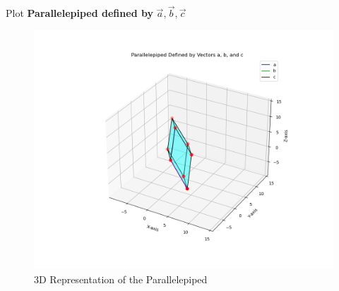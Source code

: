 \documentclass{beamer}
\begin{document}
\begin{frame}{Plot}
\centering
\textbf{Parallelepiped defined by } $\vec{a}, \vec{b}, \vec{c}$
\begin{figure}[H]
    \centering
    \includegraphics[width=0.9\columnwidth]{figs/fig1.png}
    \caption{3D Representation of the Parallelepiped}
\end{figure}
\end{frame}
\end{document}
